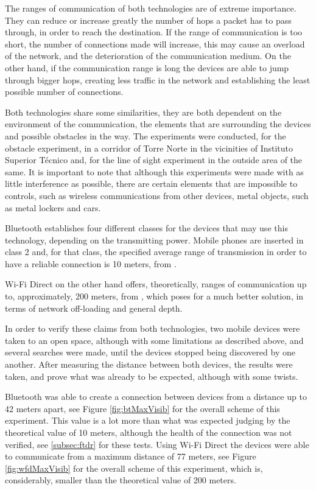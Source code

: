 The ranges of communication of both technologies are of extreme importance. They can reduce or increase greatly the number of hops a packet has to pass through, in order to reach the destination. If the range of communication is too short, the number of connections made will increase, this may cause an overload of the network, and the deterioration of the communication medium. On the other hand, if the communication range is long the devices are able to jump through bigger hops, creating less traffic in the network and establishing the least possible number of connections.

Both technologies share some similarities, they are both dependent on the environment of the communication, the elements that are surrounding the devices and possible obstacles in the way. The experiments were conducted, for the obstacle experiment, in a corridor of Torre Norte in the vicinities of Instituto Superior Técnico and, for the line of sight experiment in the outside area of the same. It is important to note that although this experiments were made with as little interference as possible, there are certain elements that are impossible to controls, such as wireless communications from other devices, metal objects, such as metal lockers and cars.

Bluetooth establishes four different classes for the devices that may use this technology, depending on the transmitting power. Mobile phones are inserted in class 2 and, for that class, the specified average range of transmission in order to have a reliable connection is 10 meters, from \cite{bluetooth}.

Wi-Fi Direct on the other hand offers, theoretically, ranges of communication up to, approximately, 200 meters, from \cite{wfdrange}, which poses for a much better solution, in terms of network off-loading and general depth.

In order to verify these claims from both technologies, two mobile devices were taken to an open space, although with some limitations as described above, and several searches were made, until the devices stopped being discovered by one another. After measuring the distance between both devices, the results were taken, and prove what was already to be expected, although with some twists. 

Bluetooth was able to create a connection between devices from a distance up to 42 meters apart, see Figure \ref{fig:btMaxVisib} for the overall scheme of this experiment. This value is a lot more than what was expected judging by the theoretical value of 10 meters, although the health of the connection was not verified, see \ref{subsec:ftdr} for these tests. Using Wi-Fi Direct the devices were able to communicate from a maximum distance of 77 meters, see Figure \ref{fig:wfdMaxVisib} for the overall scheme of this experiment, which is, considerably, smaller than the theoretical value of 200 meters.

